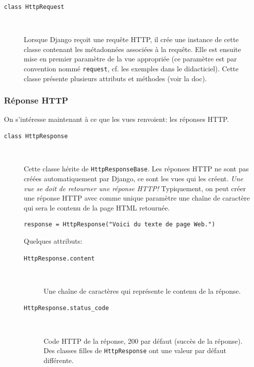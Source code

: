 \documentclass[a4paper, 10pt]{article}
\begin{document}
{\begin{description}
	\item[\texttt{class HttpRequest}]~

	      Lorsque Django reçoit une requête HTTP, il crée une instance de cette classe contenant les métadonnées associées à la requête. Elle est ensuite mise en premier paramètre de la vue appropriée (ce paramètre est par convention nommé \texttt{request}, cf. les exemples dans le didacticiel). Cette classe présente plusieurs attributs et méthodes (voir la doc).
\end{description}

\subsubsection{Réponse HTTP}
On  s'intéresse maintenant à ce que les vues renvoient: les réponses HTTP.

\begin{description}
	\item[\texttt{class HttpResponse}]~

	      Cette classe hérite de \texttt{HttpResponseBase}. Les réponses HTTP ne sont pas créées automatiquement par Django, ce sont les vues qui les créent. \emph{Une vue se doit de retourner une réponse HTTP!} Typiquement, on peut créer une réponse HTTP avec comme unique paramètre une chaîne de caractère qui sera le contenu de la page HTML retournée.

	      \begin{verbatim}
response = HttpResponse("Voici du texte de page Web.")
    \end{verbatim}

	      Quelques attributs:

	      \begin{description}
		      \item[\texttt{HttpResponse.content}]~

		            Une chaîne de caractères qui représente le contenu de la réponse.

		      \item[\texttt{HttpResponse.status_code}]~

		            Code HTTP de la réponse, 200 par défaut (succès de la réponse). Des classes filles de \texttt{HttpResponse} ont une valeur par défaut différente.
	      \end{description}


\end{description}}
\end{document}
